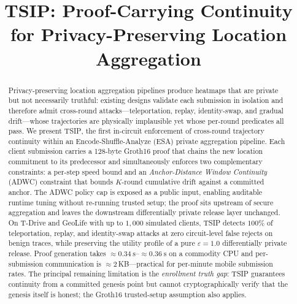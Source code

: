 \documentclass[conference]{IEEEtran}
\theoremstyle{definition}
\theoremstyle{plain}
\begin{document}
\title{TSIP: Proof-Carrying Continuity for Privacy-Preserving Location Aggregation}


\author{
	}
\maketitle
\begin{abstract}
Privacy-preserving location aggregation pipelines produce heatmaps that are
private but not necessarily truthful: existing designs validate each submission
in isolation and therefore admit cross-round attacks---teleportation, replay,
identity-swap, and gradual drift---whose trajectories are physically implausible
yet whose per-round predicates all pass.
We present \textsc{TSIP}, the first in-circuit enforcement of cross-round
trajectory continuity within an Encode-Shuffle-Analyze (ESA) private
aggregation pipeline.
Each client submission carries a 128-byte Groth16 proof that chains the new
location commitment to its predecessor and simultaneously enforces two
complementary constraints: a per-step speed bound and an
\emph{Anchor-Distance Window Continuity} (ADWC) constraint that bounds
$K$-round cumulative drift against a committed anchor.
The ADWC policy cap is exposed as a public input, enabling auditable
runtime tuning without re-running trusted setup; the proof sits upstream
of secure aggregation and leaves the downstream differentially private
release layer unchanged. On T-Drive and GeoLife with up to $1{,}000$ simulated clients, \textsc{TSIP}
detects $100\%$ of teleportation, replay, and identity-swap attacks at zero
circuit-level false rejects on benign traces, while preserving the utility
profile of a pure $\varepsilon{=}1.0$ differentially private release.
Proof generation takes ${\approx}\SI{0.34}{\second}$--${\approx}\SI{0.36}{\second}$
on a commodity CPU and per-submission communication is
${\approx}2$\,KB---practical for per-minute mobile submission rates.
The principal remaining limitation is the \emph{enrollment truth gap}:
\textsc{TSIP} guarantees continuity from a committed genesis point but
cannot cryptographically verify that the genesis itself is honest; the
Groth16 trusted-setup assumption also applies.
\end{abstract}
\IEEEpeerreviewmaketitle

\end{document}
